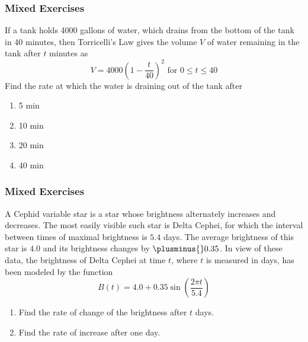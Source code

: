 \documentclass[xcolor=dvipsnames]{beamer}
\begin{document}
\begin{frame}
  \frametitle{Mixed Exercises}
  If a tank holds 4000 gallons of water, which drains from the bottom
  of the tank in 40 minutes, then Torricelli's Law gives the volume $V$
  of water remaining in the tank after $t$ minutes as
  \begin{equation}
    \label{eq:oothaich}
  V=4000\left(1−\frac{t}{40}\right)^{2}\mbox{ for }0\leq{}t\leq{}40  
  \end{equation}
  Find the rate at which the water is draining out of the tank after
  \begin{enumerate}
  \item 5 min
  \item 10 min
  \item 20 min
  \item 40 min
  \end{enumerate}
\end{frame}

\begin{frame}
  \frametitle{Mixed Exercises}
  A Cephid variable star is a star whose brightness alternately
  increases and decreases. The most easily visible such star is Delta
  Cephei, for which the interval between times of maximal brightness
  is $5.4$ days. The average brightness of this star is $4.0$ and its
  brightness changes by $\plusminus{}0.35$. In view of these data, the
  brightness of Delta Cephei at time $t$, where $t$ is measured in
  days, has been modeled by the function
  \begin{equation}
    \label{eq:duusecho}
    B(t)=4.0+0.35\sin(\frac{2\pi{}t}{5.4})  
  \end{equation}
  \begin{enumerate}
  \item Find the rate of change of the brightness after $t$ days.
  \item Find the rate of increase after one day.
  \end{enumerate}
\end{frame}

\end{document}
